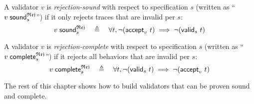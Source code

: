 \begin{definition}
  A validator $v$ is {\em rejection-sound} with respect to specification $s$
  (written as ``$v\;\mathsf{sound}_{s}^\mathfrak{Rej}$'') if it only rejects traces that are invalid
  per $s$:
  \[v\;\mathsf{sound}_{s}^\mathfrak{Rej}\quad\triangleq\quad\forall t,\neg(\mathsf{accept}_{v}~{t})\implies\neg(\mathsf{valid}_{s}~{t})\]

  A validator $v$ is {\em rejection-complete} with respect to specification $s$
  (written as ``$v\;\mathsf{complete}_{s}^\mathfrak{Rej}$'') if it rejects all behaviors that are
  invalid per $s$:
  \[v\;\mathsf{complete}_{s}^\mathfrak{Rej}\quad\triangleq\quad\forall t,\neg(\mathsf{valid}_{s}~{t})\implies\neg(\mathsf{accept}_{v}~{t})\]
\end{definition}

The rest of this chapter shows how to build validators that can be proven sound
and complete.
